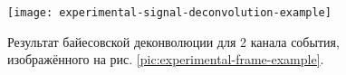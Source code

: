 \begin{figure}
	\centering
	\texttt{[image: experimental-signal-deconvolution-example]}
	\caption{Результат байесовской деконволюции для 2 канала события, изображённого на рис. \ref{pic:experimental-frame-example}.}
	\label{pic:experimental-signal-deconvolution-example}
\end{figure}

